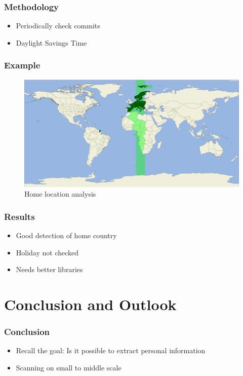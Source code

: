 \documentclass[t]{beamer}
\begin{document}
\begin{frame}
    \frametitle{Methodology}
    \begin{itemize}
        \item Periodically check commits
        \pause{}
        \item Daylight Savings Time
    \end{itemize}
\end{frame}

\begin{frame}
    \frametitle{Example}
    \begin{figure}[H]
        \includegraphics[scale=0.06]{analysis/author-home-location}
        \centering
        \caption{Home location analysis}
    \end{figure}
\end{frame}

\begin{frame}
    \frametitle{Results}
    \begin{itemize}
        \item Good detection of home country
        \pause{}
        \item Holiday not checked
        \pause{}
        \item Needs better libraries
    \end{itemize}
\end{frame}

\section{Conclusion and Outlook}
\begin{frame}
    \frametitle{Conclusion}
    \begin{itemize}
        \item Recall the goal: Is it possible to extract personal information
        \pause{}
        \item Scanning on small to middle scale
    \end{itemize}
\end{frame}
\end{document}
